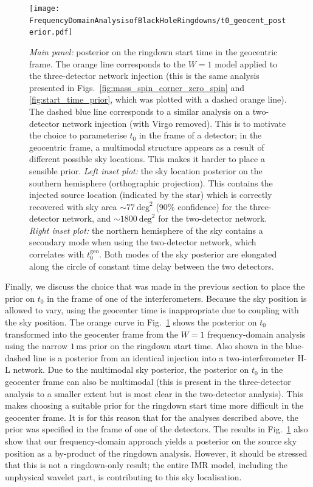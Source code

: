 \begin{figure}[t!]
    \centering
    \texttt{[image: FrequencyDomainAnalysisofBlackHoleRingdowns/t0\_geocent\_posterior.pdf]}
    \caption[Posteriors on the ringdown start time in the geocentric frame for a GW190521-like injection analysed with two- and three- detector networks]{ 
    \emph{Main panel:} posterior on the ringdown start time in the geocentric frame. The orange line corresponds to the $W=1$ model applied to the three-detector network injection (this is the same analysis presented in Figs.~\ref{fig:mass_spin_corner_zero_spin} and \ref{fig:start_time_prior}, which was plotted with a dashed orange line). 
    The dashed blue line corresponds to a similar analysis on a two-detector network injection (with Virgo removed). This is to motivate the choice to parameterise $t_0$ in the frame of a detector; in the geocentric frame, a multimodal structure appears as a result of different possible sky locations. This makes it harder to place a sensible prior.
    \emph{Left inset plot:} the sky location posterior on the southern hemisphere (orthographic projection). This contains the injected source location (indicated by the star) which is correctly recovered with sky area $\sim 77\ \mathrm{deg}^2$ (90\% confidence) for the three-detector network, and $\sim 1800\ \mathrm{deg}^2$ for the two-detector network.
    \emph{Right inset plot:} the northern hemisphere of the sky contains a secondary mode when using the two-detector network, which correlates with $t_0^\mathrm{geo}$. Both modes of the sky posterior are elongated along the circle of constant time delay between the two detectors.
    }
    \label{fig:t0_geocent_posterior}
\end{figure}

Finally, we discuss the choice that was made in the previous section to place the prior on $t_0$ in the frame of one of the interferometers.
Because the sky position is allowed to vary, using the geocenter time is inappropriate due to coupling with the sky position.
The orange curve in Fig.~\ref{fig:t0_geocent_posterior} shows the posterior on $t_0$ transformed into the geocenter frame from the $W=1$ frequency-domain analysis using the narrow $1\,\mathrm{ms}$ prior on the ringdown start time. 
Also shown in the blue-dashed line is a posterior from an identical injection into a two-interferometer H-L network.
Due to the multimodal sky posterior, the posterior on $t_0$ in the geocenter frame can also be multimodal (this is present in the three-detector analysis to a smaller extent but is most clear in the two-detector analysis).
This makes choosing a suitable prior for the ringdown start time more difficult in the geocenter frame.
It is for this reason that for the analyses described above, the prior was specified in the frame of one of the detectors.
The results in Fig.~\ref{fig:t0_geocent_posterior} also show that our frequency-domain approach yields a posterior on the source sky position as a by-product of the ringdown analysis. However, it should be stressed that this is not a ringdown-only result; the entire IMR model, including the unphysical wavelet part, is contributing to this sky localisation.


